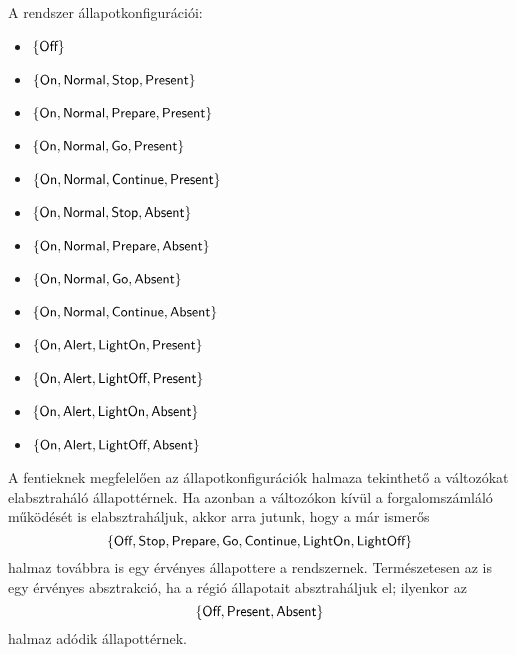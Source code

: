 \begin{megjegyzes}
A rendszer állapotkonfigurációi:

\begin{itemize}
\item $\{ \textsf{Off} \}$
\item $\{ \textsf{On}, \textsf{Normal}, \textsf{Stop}, \textsf{Present} \}$
\item $\{ \textsf{On}, \textsf{Normal}, \textsf{Prepare}, \textsf{Present} \}$
\item $\{ \textsf{On}, \textsf{Normal}, \textsf{Go}, \textsf{Present} \}$
\item $\{ \textsf{On}, \textsf{Normal}, \textsf{Continue}, \textsf{Present} \}$
\item $\{ \textsf{On}, \textsf{Normal}, \textsf{Stop}, \textsf{Absent} \}$
\item $\{ \textsf{On}, \textsf{Normal}, \textsf{Prepare}, \textsf{Absent} \}$
\item $\{ \textsf{On}, \textsf{Normal}, \textsf{Go}, \textsf{Absent} \}$
\item $\{ \textsf{On}, \textsf{Normal}, \textsf{Continue}, \textsf{Absent} \}$
\item $\{ \textsf{On}, \textsf{Alert}, \textsf{LightOn}, \textsf{Present} \}$
\item $\{ \textsf{On}, \textsf{Alert}, \textsf{LightOff}, \textsf{Present} \}$
\item $\{ \textsf{On}, \textsf{Alert}, \textsf{LightOn}, \textsf{Absent} \}$
\item $\{ \textsf{On}, \textsf{Alert}, \textsf{LightOff}, \textsf{Absent} \}$
\end{itemize}
\end{megjegyzes}

\begin{megjegyzes}
A fentieknek megfelelően az állapotkonfigurációk halmaza tekinthető a változókat elabsztraháló állapottérnek. Ha azonban a változókon kívül a forgalomszámláló működését is elabsztraháljuk, akkor arra jutunk, hogy a már ismerős
$$\{ \textsf{Off}, \textsf{Stop}, \textsf{Prepare}, \textsf{Go}, \textsf{Continue}, \textsf{LightOn}, \textsf{LightOff} \}$$
halmaz továbbra is egy érvényes állapottere a rendszernek. Természetesen az is egy érvényes absztrakció, ha a  régió állapotait absztraháljuk el; ilyenkor az
$$\{ \textsf{Off}, \textsf{Present}, \textsf{Absent} \}$$
halmaz adódik állapottérnek.
\end{megjegyzes}

